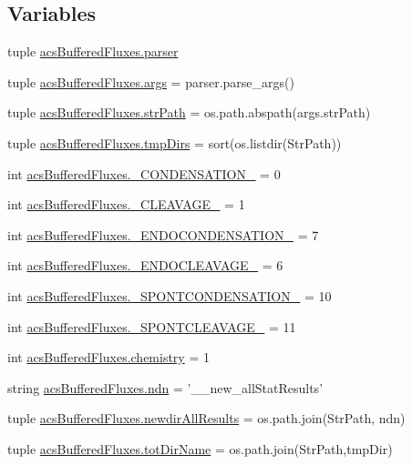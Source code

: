 \subsection*{Variables}
\begin{DoxyCompactItemize}
\item 
tuple \hyperlink{a00098_adba84e3872cb47cad219837458e56677}{acs\-Buffered\-Fluxes.\-parser}
\item 
tuple \hyperlink{a00098_afa2d0b9fb021746e05cd06277997da04}{acs\-Buffered\-Fluxes.\-args} = parser.\-parse\-\_\-args()
\item 
tuple \hyperlink{a00098_a8932cabcf73065a531104c53a324508a}{acs\-Buffered\-Fluxes.\-str\-Path} = os.\-path.\-abspath(args.\-str\-Path)
\item 
tuple \hyperlink{a00098_af740eb0100dc7010628161baeaf9b474}{acs\-Buffered\-Fluxes.\-tmp\-Dirs} = sort(os.\-listdir(Str\-Path))
\item 
int \hyperlink{a00098_aad87b9d241bea71df95c318686aca066}{acs\-Buffered\-Fluxes.\-\_\-\-C\-O\-N\-D\-E\-N\-S\-A\-T\-I\-O\-N\-\_\-} = 0
\item 
int \hyperlink{a00098_af81d6d0377f4d99177961a5604f58ed2}{acs\-Buffered\-Fluxes.\-\_\-\-C\-L\-E\-A\-V\-A\-G\-E\-\_\-} = 1
\item 
int \hyperlink{a00098_a0637697acae236afe5e5ae8dc1d85431}{acs\-Buffered\-Fluxes.\-\_\-\-E\-N\-D\-O\-C\-O\-N\-D\-E\-N\-S\-A\-T\-I\-O\-N\-\_\-} = 7
\item 
int \hyperlink{a00098_a4535f1f4043aef3195766733626b61e4}{acs\-Buffered\-Fluxes.\-\_\-\-E\-N\-D\-O\-C\-L\-E\-A\-V\-A\-G\-E\-\_\-} = 6
\item 
int \hyperlink{a00098_a33ff8ddc4a26ccd45029e2b369391aba}{acs\-Buffered\-Fluxes.\-\_\-\-S\-P\-O\-N\-T\-C\-O\-N\-D\-E\-N\-S\-A\-T\-I\-O\-N\-\_\-} = 10
\item 
int \hyperlink{a00098_a485cf1077a4ece847800617ede00e458}{acs\-Buffered\-Fluxes.\-\_\-\-S\-P\-O\-N\-T\-C\-L\-E\-A\-V\-A\-G\-E\-\_\-} = 11
\item 
int \hyperlink{a00098_ab4fd705796fd835a4238fecdc3caf76e}{acs\-Buffered\-Fluxes.\-chemistry} = 1
\item 
string \hyperlink{a00098_a5df7e71a36351afd3e59d6f50a94bdaf}{acs\-Buffered\-Fluxes.\-ndn} = '\-\_\-\_\-new\-\_\-all\-Stat\-Results'
\item 
tuple \hyperlink{a00098_ae53bd92b0509a8f35e92e734a7f4b4e1}{acs\-Buffered\-Fluxes.\-newdir\-All\-Results} = os.\-path.\-join(Str\-Path, ndn)
\item 
tuple \hyperlink{a00098_a7883e37b9556e49968e7a7dd08893bfb}{acs\-Buffered\-Fluxes.\-tot\-Dir\-Name} = os.\-path.\-join(Str\-Path,tmp\-Dir)

\end{DoxyCompactItemize}
